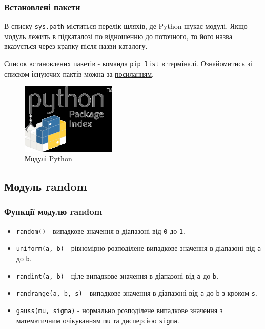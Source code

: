 \begin{frame}
\frametitle{Встановлені пакети}
В списку \texttt{sys.path} міститься перелік шляхів, де Python шукає модулі. Якщо модуль лежить в підкаталозі по відношенню до поточного, то його назва вказується через крапку після назви каталогу. 

Список встановлених пакетів - команда \texttt{pip list} в терміналі. Ознайомитись зі списком існуючих пактів можна за \href{https://pypi.org/}{посиланням}.

\begin{figure}
  \begin{center}
    \includegraphics[width=0.4\textwidth,height=0.35\textheight]{pictures/pypi.png}
  \caption{Модулі Python}
\label{function}
  \end{center}
\end{figure}
\end{frame}

\subsection{Модуль random} 
\begin{frame}
\frametitle{Функції модулю random}
\begin{itemize}
  \item<1-> \texttt{random()} - випадкове значення в діапазоні від \texttt{0} до \texttt{1}.
  \item<2-> \texttt{uniform(a, b)} - рівномірно розподілене випадкове значення в діапазоні від \texttt{a} до \texttt{b}. 
  \item<3-> \texttt{randint(a, b)} - ціле випадкове значення в діапазоні від \texttt{a} до \texttt{b}.
  \item<4-> \texttt{randrange(a, b, s)} - випадкове значення в діапазоні від \texttt{a} до \texttt{b} з кроком \texttt{s}.
  \item<5-> \texttt{gauss(mu, sigma)} - нормально розподілене випадкове значення з математичним очікуванням \texttt{mu} та дисперсією \texttt{sigma}.
\end{itemize}

\end{frame}

